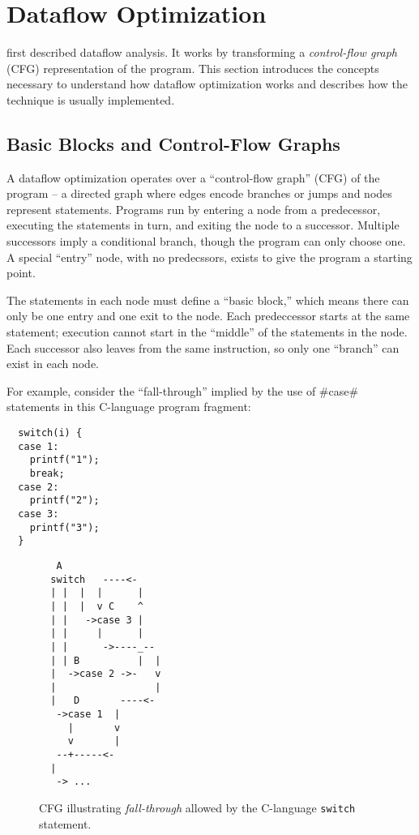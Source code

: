 \documentclass[12pt]{report}
\begin{document}


\section{Dataflow Optimization}

\citet{SoAndSo} first described dataflow
analysis. It works by transforming a \emph{control-flow graph} (CFG)
representation of the program. This section introduces the concepts
necessary to understand how dataflow optimization works and describes
how the technique is usually implemented.

\subsection{Basic Blocks and Control-Flow Graphs}

A dataflow optimization operates over a ``control-flow graph'' (CFG)
of the program -- a directed graph where edges encode branches or
jumps and nodes represent statements. Programs run by entering a node
from a predecessor, executing the statements in turn, and exiting the
node to a successor. Multiple successors imply a conditional branch,
though the program can only choose one. A special ``entry'' node, with
no predecssors, exists to give the program a starting point.

The statements in each node must define a ``basic block,'' which means
there can only be one entry and one exit to the node. Each 
predeccessor starts at the same statement; execution cannot start in
the ``middle'' of the statements in the node. Each successor also
leaves from the same instruction, so only one ``branch'' can exist in
each node.

For example, consider the ``fall-through'' implied by the use of #case#
statements in this C-language program fragment:

\begin{verbatim}
  switch(i) {
  case 1:
    printf("1");
    break;
  case 2:
    printf("2");
  case 3:
    printf("3");
  }
\end{verbatim}

\begin{figure}[h]
\begin{verbatim}
   A
  switch   ----<-
  | |  |  |      |
  | |  |  v C    ^
  | |   ->case 3 |
  | |     |      |
  | |      ->----_-- 
  | | B          |  |
  |  ->case 2 ->-   v
  |                 |
  |   D       ----<-
   ->case 1  |
     |       v
     v       |
   --+-----<-      
  |  
   -> ...
\end{verbatim}
\caption{CFG illustrating \emph{fall-through} allowed by the
  C-language \texttt{switch} statement.}
\label{switchCfgEg}
\end{figure}
\end{document}
